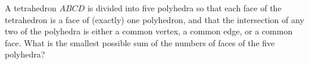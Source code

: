 A tetrahedron $ABCD$ is divided into five polyhedra so that each face of the tetrahedron is a face of (exactly) one polyhedron, and that the intersection of any two of the polyhedra is either a common vertex, a common edge, or a common face. What is the smallest possible sum of the numbers of faces of the five polyhedra?